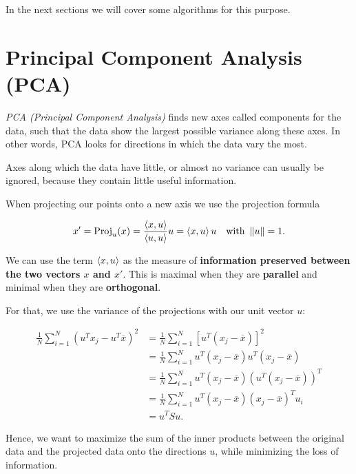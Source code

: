 In the next sections we will cover some algorithms for this purpose.

\section{Principal Component Analysis (PCA)}

\emph{PCA (Principal Component Analysis)} finds new axes called components for the data, such that the data show the largest possible variance along these axes.
In other words, PCA looks for directions in which the data vary the most.

Axes along which the data have little, or almost no variance can usually be ignored, because they contain little useful information.

When projecting our points onto a new axis we use the projection formula

\[
	x' = \mathrm{Proj}_{u}(x) = \frac{\left\langle x, u\right\rangle}{\left\langle u, u\right\rangle} u = \left\langle x, u\right\rangle u \quad \text{with } \left\| u \right\| = 1.
\]

We can use the term \(\left\langle x, u\right\rangle\) as the measure of \textbf{information preserved between the two vectors \(x\) and \(x'\)}. This is
maximal when they are \textbf{parallel} and minimal when they are \textbf{orthogonal}.

For that, we use the variance of the projections with our unit vector \(u\):

\begin{align*}
	\frac{1}{N} \sum_{i = 1}^{N} (u^T x_j -  u^T \overline{x})^2 & = \frac{1}{N} \sum_{i = 1}^{N} [u^T (x_j - \overline{x})]^2                           \\
	                                                                 & = \frac{1}{N} \sum_{i = 1}^{N} u^T (x_j - \overline{x}) u^T(x_j - \overline{x})     \\
	                                                                 & = \frac{1}{N} \sum_{i = 1}^{N} u^T (x_j - \overline{x}) (u^T(x_j - \overline{x}))^T \\
	                                                                 & = \frac{1}{N} \sum_{i = 1}^{N} u^T (x_j - \overline{x}) (x_j - \overline{x})^Tu_i     \\
	                                                                 & =  u^T S u.
\end{align*}

Hence, we want to maximize the sum of the inner products between the original data and the projected data onto the directions \(u\), while minimizing the loss of information.

